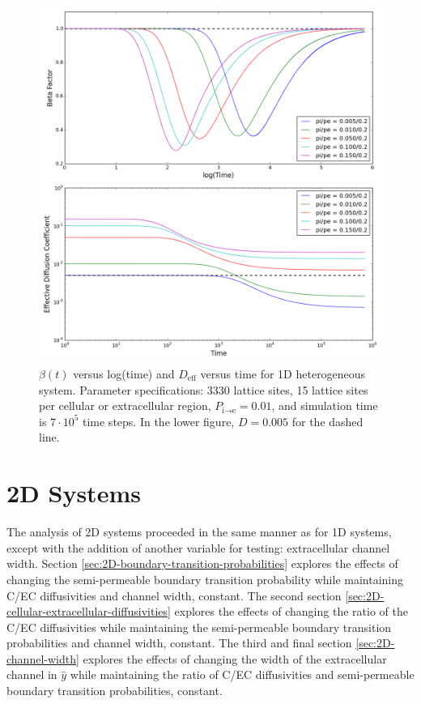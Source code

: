 	\begin{figure}[h!]
		\centering
		\includegraphics[width=1.0\linewidth]{../images/1D/pipe_beta_deff_1D}
		\caption[1D: $ \beta (t) $ and $ D_\textrm{eff} $ for varying diffusivities]{$ \beta (t) $ versus log(time) and $ D_\textrm{eff} $ versus time for 1D heterogeneous system. Parameter specifications: 3330 lattice sites, 15 lattice sites per cellular or extracellular region, $ P_{\textrm{i} \rightarrow \textrm{e}} = 0.01 $, and simulation time is $ 7\cdot 10^5 $ time steps. In the lower figure, $ D = 0.005 $ for the dashed line.}
		\label{fig:pipe_beta_deff_1D}
	\end{figure}

\clearpage
\section{2D Systems}
\label{sec:ra-2D}
	The analysis of 2D systems proceeded in the same manner as for 1D systems, except with the addition of another variable for testing: extracellular channel width. Section \ref{sec:2D-boundary-transition-probabilities} explores the effects of changing the semi-permeable boundary transition probability while maintaining C/EC diffusivities and channel width, constant. The second section \ref{sec:2D-cellular-extracellular-diffusivities} explores the effects of changing the ratio of the C/EC diffusivities while maintaining the semi-permeable boundary transition probabilities and channel width, constant. The third and final section \ref{sec:2D-channel-width} explores the effects of changing the width of the extracellular channel in $ \hat{y} $ while maintaining the ratio of C/EC diffusivities and semi-permeable boundary transition probabilities, constant.
	
